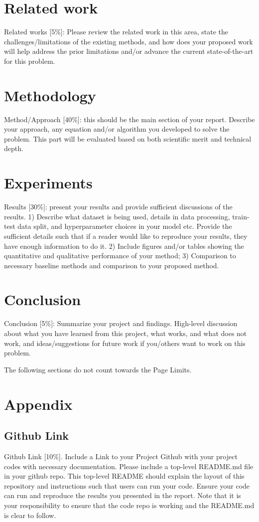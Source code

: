 \documentclass{article}
\newcommand{\instructions}[1]{{\color{blue} #1}}
\begin{document}
\section{Related work}
\instructions{Related works [5\%]: Please review the related work in this area, state the challenges/limitations of the existing methods, and how does your proposed work will help address the prior limitations and/or advance the current state-of-the-art for this problem.}

\section{Methodology}
\instructions{Method/Approach [40\%]: this should be the main section of your report. Describe your approach, any equation and/or algorithm you developed to solve the problem. This part will be evaluated based on both scientific merit and technical depth.} 


\section{Experiments}
\instructions{Results [30\%]: present your results and provide sufficient discussions of the results. 1) Describe what dataset is being used, details in data processing, train-test data split, and hyperparameter choices in your model etc. Provide the sufficient details such that if a reader would like to reproduce your results, they have enough information to do it. 2) Include figures and/or tables showing the quantitative and qualitative performance of your method; 3) Comparison to necessary baseline methods and comparison to your proposed method.} 

\section{Conclusion}
\instructions{Conclusion [5\%]: Summarize your project and findings. High-level discussion about what you have learned from this project, what works, and what does not work, and ideas/suggestions for future work if you/others want to work on this problem.}

\newpage
\instructions{The following sections do not count towards the Page Limits.}
\section*{Appendix}
\subsection*{Github Link}
\instructions{Github Link [10\%]. Include a Link to your Project Github with your project codes with necessary documentation. Please include a top-level README.md file in your github repo. This top-level README should explain the layout of this repository and instructions such that users can run your code. Ensure your code can run and reproduce the results you presented in the report. Note that it is your responsibility to ensure that the code repo is working and the README.md is clear to follow.}
\end{document}
